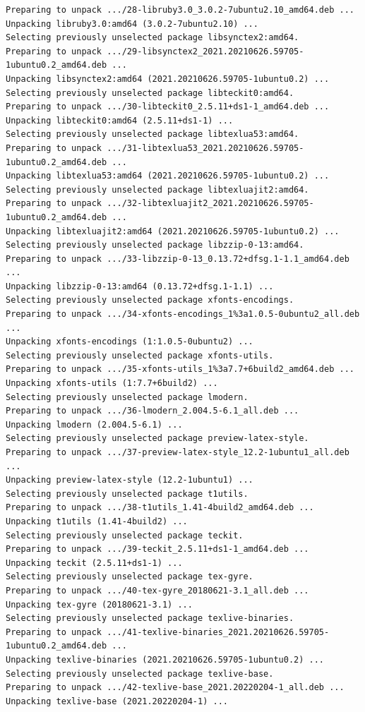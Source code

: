 \documentclass[
  11pt,
  letterpaper,
]{book}
\begin{document}
\begin{verbatim}
Preparing to unpack .../28-libruby3.0_3.0.2-7ubuntu2.10_amd64.deb ...
Unpacking libruby3.0:amd64 (3.0.2-7ubuntu2.10) ...
Selecting previously unselected package libsynctex2:amd64.
Preparing to unpack .../29-libsynctex2_2021.20210626.59705-1ubuntu0.2_amd64.deb ...
Unpacking libsynctex2:amd64 (2021.20210626.59705-1ubuntu0.2) ...
Selecting previously unselected package libteckit0:amd64.
Preparing to unpack .../30-libteckit0_2.5.11+ds1-1_amd64.deb ...
Unpacking libteckit0:amd64 (2.5.11+ds1-1) ...
Selecting previously unselected package libtexlua53:amd64.
Preparing to unpack .../31-libtexlua53_2021.20210626.59705-1ubuntu0.2_amd64.deb ...
Unpacking libtexlua53:amd64 (2021.20210626.59705-1ubuntu0.2) ...
Selecting previously unselected package libtexluajit2:amd64.
Preparing to unpack .../32-libtexluajit2_2021.20210626.59705-1ubuntu0.2_amd64.deb ...
Unpacking libtexluajit2:amd64 (2021.20210626.59705-1ubuntu0.2) ...
Selecting previously unselected package libzzip-0-13:amd64.
Preparing to unpack .../33-libzzip-0-13_0.13.72+dfsg.1-1.1_amd64.deb ...
Unpacking libzzip-0-13:amd64 (0.13.72+dfsg.1-1.1) ...
Selecting previously unselected package xfonts-encodings.
Preparing to unpack .../34-xfonts-encodings_1%3a1.0.5-0ubuntu2_all.deb ...
Unpacking xfonts-encodings (1:1.0.5-0ubuntu2) ...
Selecting previously unselected package xfonts-utils.
Preparing to unpack .../35-xfonts-utils_1%3a7.7+6build2_amd64.deb ...
Unpacking xfonts-utils (1:7.7+6build2) ...
Selecting previously unselected package lmodern.
Preparing to unpack .../36-lmodern_2.004.5-6.1_all.deb ...
Unpacking lmodern (2.004.5-6.1) ...
Selecting previously unselected package preview-latex-style.
Preparing to unpack .../37-preview-latex-style_12.2-1ubuntu1_all.deb ...
Unpacking preview-latex-style (12.2-1ubuntu1) ...
Selecting previously unselected package t1utils.
Preparing to unpack .../38-t1utils_1.41-4build2_amd64.deb ...
Unpacking t1utils (1.41-4build2) ...
Selecting previously unselected package teckit.
Preparing to unpack .../39-teckit_2.5.11+ds1-1_amd64.deb ...
Unpacking teckit (2.5.11+ds1-1) ...
Selecting previously unselected package tex-gyre.
Preparing to unpack .../40-tex-gyre_20180621-3.1_all.deb ...
Unpacking tex-gyre (20180621-3.1) ...
Selecting previously unselected package texlive-binaries.
Preparing to unpack .../41-texlive-binaries_2021.20210626.59705-1ubuntu0.2_amd64.deb ...
Unpacking texlive-binaries (2021.20210626.59705-1ubuntu0.2) ...
Selecting previously unselected package texlive-base.
Preparing to unpack .../42-texlive-base_2021.20220204-1_all.deb ...
Unpacking texlive-base (2021.20220204-1) ...

\end{verbatim}
\end{document}
